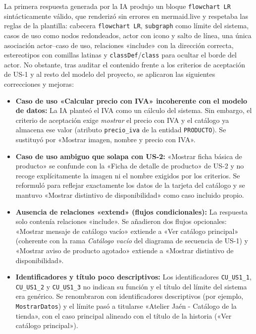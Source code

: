 La primera respuesta generada por la IA produjo un bloque \texttt{flowchart LR} sintácticamente válido, que renderizó sin errores en mermaid.live y respetaba las reglas de la plantilla: cabecera \texttt{flowchart LR}, \texttt{subgraph} como límite del sistema, casos de uso como nodos redondeados, actor con icono y salto de línea, una única asociación actor--caso de uso, relaciones «include» con la dirección correcta, estereotipos con comillas latinas y \texttt{classDef}/\texttt{class} para ocultar el borde del actor. No obstante, tras auditar el contenido frente a los criterios de aceptación de US-1 y al resto del modelo del proyecto, se aplicaron las siguientes correcciones y mejoras:
\begin{itemize}[leftmargin=*,nosep]
\item \textbf{Caso de uso «Calcular precio con IVA» incoherente con el modelo de datos:} La IA planteó el IVA como un cálculo del sistema. Sin embargo, el criterio de aceptación exige \emph{mostrar} el precio con IVA y el catálogo ya almacena ese valor (atributo \texttt{precio\_iva} de la entidad \texttt{PRODUCTO}). Se sustituyó por «Mostrar imagen, nombre y precio con IVA».
\item \textbf{Caso de uso ambiguo que solapa con US-2:} «Mostrar ficha básica de producto» se confunde con la «Ficha de detalle de producto» de US-2 y no recoge explícitamente la imagen ni el nombre exigidos por los criterios. Se reformuló para reflejar exactamente los datos de la tarjeta del catálogo y se mantuvo «Mostrar distintivo de disponibilidad» como caso incluido propio.
\item \textbf{Ausencia de relaciones «extend» (flujos condicionales):} La respuesta solo contenía relaciones «include». Se añadieron dos flujos opcionales: «Mostrar mensaje de catálogo vacío» extiende a «Ver catálogo principal» (coherente con la rama \emph{Catálogo vacío} del diagrama de secuencia de US-1) y «Mostrar aviso de producto agotado» extiende a «Mostrar distintivo de disponibilidad».
\item \textbf{Identificadores y título poco descriptivos:} Los identificadores \texttt{CU\_US1\_1}, \texttt{CU\_US1\_2} y \texttt{CU\_US1\_3} no indican su función y el título del límite del sistema era genérico. Se renombraron con identificadores descriptivos (por ejemplo, \texttt{MostrarDatos}) y el límite pasó a titularse «Atelier Jaén - Catálogo de la tienda», con el caso principal alineado con el título de la historia («Ver catálogo principal»).
\end{itemize}
